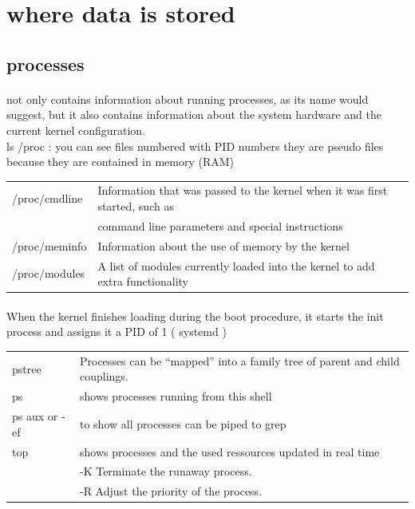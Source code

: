\documentclass[10pt]{article}
\begin{document}
\section {where data is stored}
\subsection{processes}
\paragraph{}
not only contains information about running processes, as its name would suggest, but it also contains information about the system hardware and the current kernel configuration.\\
ls /proc : you can see files numbered with PID numbers they are pseudo files because they are contained in memory (RAM)
\begin{center}
	\begin{tabular}{ l l }

		/proc/cmdline		& Information that was passed to the kernel when it was first started, such as\\
							&command line parameters and special instructions\\
		/proc/meminfo		& Information about the use of memory by the kernel\\
		/proc/modules		& A list of modules currently loaded into the kernel to add extra functionality\\

	\end{tabular}
\end{center}
\paragraph{}
When the kernel finishes loading during the boot procedure, it starts the init process and assigns it a PID of 1 ( systemd )
\begin{center}
	\begin{tabular}{|l|l|}
		\hline


		pstree &Processes can be “mapped” into a family tree of parent and child couplings.\\
		ps  &shows processes running from this shell\\
		ps aux or -ef &to show all processes can be piped to grep\\
		top  &shows processes and the used ressources updated in real time\\
			 & -K		Terminate the runaway process.\\
			 &-R		Adjust the priority of the process.\\
			 \hline
	\end{tabular}
\end{center}
\end{document}

